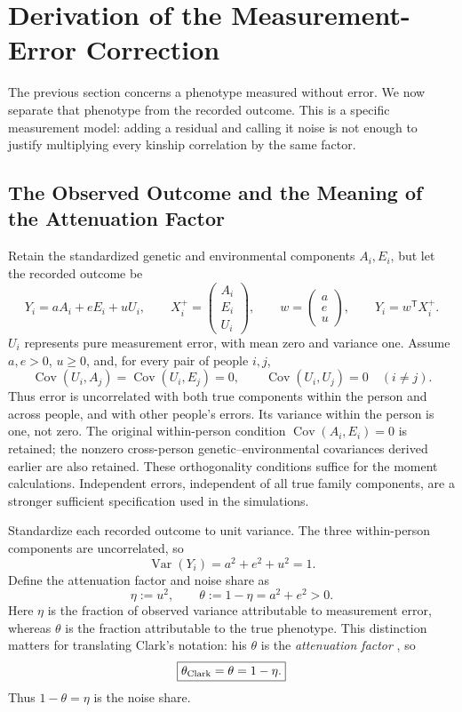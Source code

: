 \section{Derivation of the Measurement-Error Correction}
\label{app:measurement-error}

The previous section concerns a phenotype measured without error. We now
separate that phenotype from the recorded outcome. This is a specific
measurement model: adding a residual and calling it noise is not enough
to justify multiplying every kinship correlation by the same factor.

\subsection{The Observed Outcome and the Meaning of the Attenuation Factor}

Retain the standardized genetic and environmental components $A_i,E_i$,
but let the recorded outcome be
\begin{equation}
 Y_i=aA_i+eE_i+uU_i,\qquad
 X_i^+=\begin{pmatrix}A_i\\E_i\\U_i\end{pmatrix},\qquad
 w=\begin{pmatrix}a\\e\\u\end{pmatrix},\qquad Y_i=w^{\mathsf T}X_i^+.
 \label{eq:me-outcome}
\end{equation}
$U_i$ represents pure measurement error, with mean zero and variance
one. Assume $a,e>0$, $u\geq0$, and, for every pair of people $i,j$,
\begin{equation}
 \operatorname{Cov}(U_i,A_j)=\operatorname{Cov}(U_i,E_j)=0,\qquad
 \operatorname{Cov}(U_i,U_j)=0\quad(i\ne j).
 \label{eq:me-orthogonality}
\end{equation}
Thus error is uncorrelated with both true components within the person
and across people, and with other people's errors. Its variance within
the person is one, not zero. The original within-person condition
$\operatorname{Cov}(A_i,E_i)=0$ is retained; the nonzero cross-person
genetic--environmental covariances derived earlier are also retained.
These orthogonality conditions suffice for the moment calculations.
Independent errors, independent of all true family components, are a
stronger sufficient specification used in the simulations.

Standardize each recorded outcome to unit variance. The three
within-person components are uncorrelated, so
\[
 \operatorname{Var}(Y_i)=a^2+e^2+u^2=1.
\]
Define the attenuation factor and noise share as
\begin{equation}
 \eta:=u^2,\qquad
 \theta:=1-\eta=a^2+e^2>0.
 \label{eq:me-shares}
\end{equation}
Here $\eta$ is the fraction of observed variance attributable to
measurement error, whereas $\theta$ is the fraction attributable to
the true phenotype. This distinction matters for translating Clark's
notation: his $\theta$ is the \emph{attenuation factor}
\citep[p.~42 and Table~A1]{Clark2026}, so
\[
 \boxed{\theta_{\rm Clark}=\theta=1-\eta.}
\]
Thus $1-\theta=\eta$ is the noise share.

